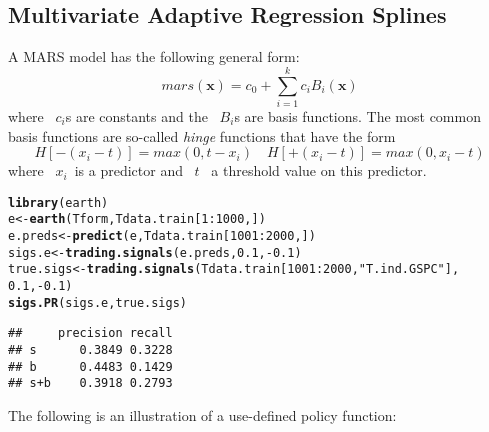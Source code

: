 \documentclass{article}\usepackage[]{graphicx}\usepackage[]{color}
\makeatletter
\newcommand{\hlnum}[1]{\textcolor[rgb]{0.686,0.059,0.569}{#1}}%
\newcommand{\hlstr}[1]{\textcolor[rgb]{0.192,0.494,0.8}{#1}}%
\newcommand{\hlopt}[1]{\textcolor[rgb]{0,0,0}{#1}}%
\newcommand{\hlstd}[1]{\textcolor[rgb]{0.345,0.345,0.345}{#1}}%
\newcommand{\hlkwb}[1]{\textcolor[rgb]{0.69,0.353,0.396}{#1}}%
\newcommand{\hlkwd}[1]{\textcolor[rgb]{0.737,0.353,0.396}{\textbf{#1}}}%
\newenvironment{kframe}{%
 \def\at@end@of@kframe{}%
 \ifinner\ifhmode%
  \def\at@end@of@kframe{\end{minipage}}%
  \begin{minipage}{\columnwidth}%
 \fi\fi%
 \def\FrameCommand##1{\hskip\@totalleftmargin \hskip-\fboxsep
 \colorbox{shadecolor}{##1}\hskip-\fboxsep
     \hskip-\linewidth \hskip-\@totalleftmargin \hskip\columnwidth}%
 \MakeFramed {\advance\hsize-\width
   \@totalleftmargin\z@ \linewidth\hsize
   \@setminipage}}%
 {\par\unskip\endMakeFramed%
 \at@end@of@kframe}
\newenvironment{knitrout}{}{} %
\makeatother
\begin{document}
\subsection{Multivariate Adaptive Regression Splines}
A MARS model has the following general form:
$$mars(\mathbf{x}) = c_0 + \sum_{i=1}^kc_iB_i(\mathbf{x})$$
where ~$c_i$s are constants and the ~$B_i$s are basis functions.
The most common basis functions are so-called \textit{hinge} functions that have the form
$$H[-(x_i - t)] = max(0, t - x_i) \quad H[+(x_i - t)] = max(0, x_i - t)$$
where ~$x_i$~is a predictor and ~$t$~ a threshold value on this predictor.
\begin{knitrout}
\color{fgcolor}\begin{kframe}
\begin{alltt}
\hlkwd{library}\hlstd{(earth)}
\hlstd{e} \hlkwb{<-} \hlkwd{earth}\hlstd{(Tform, Tdata.train[}\hlnum{1}\hlopt{:}\hlnum{1000}\hlstd{, ])}
\hlstd{e.preds} \hlkwb{<-} \hlkwd{predict}\hlstd{(e, Tdata.train[}\hlnum{1001}\hlopt{:}\hlnum{2000}\hlstd{, ])}
\hlstd{sigs.e} \hlkwb{<-} \hlkwd{trading.signals}\hlstd{(e.preds,} \hlnum{0.1}\hlstd{,} \hlopt{-}\hlnum{0.1}\hlstd{)}
\hlstd{true.sigs} \hlkwb{<-} \hlkwd{trading.signals}\hlstd{(Tdata.train[}\hlnum{1001}\hlopt{:}\hlnum{2000}\hlstd{,} \hlstr{"T.ind.GSPC"}\hlstd{],}
                             \hlnum{0.1}\hlstd{,} \hlopt{-}\hlnum{0.1}\hlstd{)}
\hlkwd{sigs.PR}\hlstd{(sigs.e, true.sigs)}
\end{alltt}
\begin{verbatim}
##     precision recall
## s      0.3849 0.3228
## b      0.4483 0.1429
## s+b    0.3918 0.2793
\end{verbatim}
\end{kframe}
\end{knitrout}
The following is an illustration of a use-defined policy function:
\end{document}
